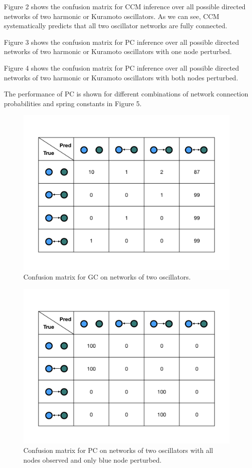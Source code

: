 \documentclass[]{article}
\begin{document}
Figure 2 shows the confusion matrix for CCM inference over all possible directed networks of two harmonic or Kuramoto oscillators. As we can see, CCM systematically predicts that all two oscillator networks are fully connected.

Figure 3 shows the confusion matrix for PC inference over all possible directed networks of two harmonic or Kuramoto oscillators with one node perturbed.

Figure 4 shows the confusion matrix for PC inference over all possible directed networks of two harmonic or Kuramoto oscillators with both nodes perturbed.

The performance of PC is shown for different combinations of network connection probabilities and spring constants in Figure 5.

\begin{figure}
    \centering
    \includegraphics[width=12cm]{GrangerConfusionMatrix.jpeg}
    \caption{Confusion matrix for GC on networks of two oscillators.}
    \label{fig:example}
\end{figure}

\begin{figure}
    \centering
    \includegraphics[width=12cm]{Pert1ConfusionMatrix.jpeg}
    \caption{Confusion matrix for PC on networks of two oscillators with all nodes observed and only blue node perturbed.}
    \label{fig:example}
\end{figure}
\end{document}
